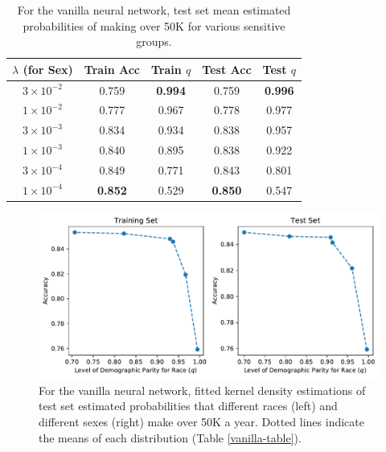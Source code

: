 \documentclass{article}
\begin{document}
\begin{table}[h]
\centering
\begin{tabular}{c|cc |cc} 
 \hline
 \hline
 $\lambda$ (for Sex) & Train Acc & Train $q$ & Test Acc & Test $q$ \\ 
 \hline
 $3 \times 10^{-2}$ & 0.759 & \textbf{0.994} & 0.759 & \textbf{0.996}\\
 $1 \times 10^{-2}$ &0.777& 0.967 & 0.778 & 0.977\\
$3 \times 10^{-3}$ & 0.834 & 0.934 & 0.838 & 0.957 \\
$1 \times 10^{-3}$ & 0.840 & 0.895 & 0.838 &0.922 \\
$3 \times 10^{-4}$ & 0.849 & 0.771 & 0.843 & 0.801\\
$1 \times 10^{-4}$ & \textbf{0.852} & 0.529 & \textbf{0.850} & 0.547\\
 \hline
\end{tabular}
\caption{For the vanilla neural network, test set mean estimated probabilities of making over 50K for various sensitive groups.} \label{boundary-table-sex}
\end{table}

\begin{figure}[ht]
\vskip 0.2in
\begin{center}
\centerline{\includegraphics[width=\columnwidth]{img/boundary-tradeoff-race.pdf}}
\caption{For the vanilla neural network, fitted kernel density estimations of test set estimated probabilities that different races (left) and different sexes (right) make over 50K a year.  Dotted lines indicate the means of each distribution (Table \ref{vanilla-table}).}
\label{boundary-fig-race}
\end{center}
\vskip -0.2in
\end{figure}
\end{document}
